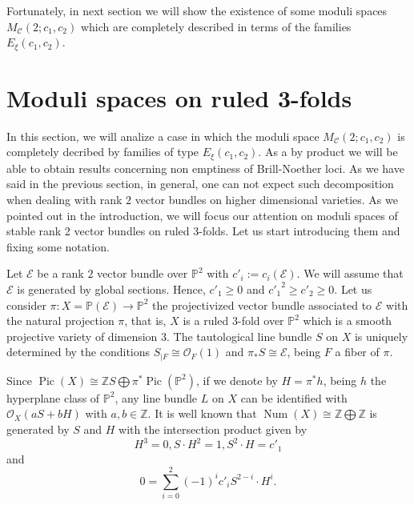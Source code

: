 \documentclass[11pt,twoside]{amsart}
\theoremstyle{definition}
\newcommand{\Pic}{\operatorname{Pic}}
\newcommand{\Num}{\operatorname{Num}}
\begin{document}
Fortunately, in next section we will show the existence of some moduli spaces $M_{\mathcal{C}}(2;c_1,c_2)$ which are completely described in terms of the families $E_{\xi}(c_1,c_2)$.




\section{Moduli spaces on ruled 3-folds}

In this section, we will analize a case in which  the moduli space $M_{\mathcal{C}}(2;c_1,c_2)$ is completely decribed by  families of type $E_{\xi}(c_1,c_2)$. As a by product we will be able to obtain results concerning non emptiness of Brill-Noether loci. As we have said in the previous section, in general, one can not expect such decomposition when dealing with rank $2$ vector bundles on higher dimensional varieties. As we pointed out in the introduction, we will focus our attention on moduli spaces of stable rank 2 vector bundles on ruled 3-folds. Let us start introducing them and fixing some notation. 

\vspace{3mm}
Let $\mathcal{E}$ be a rank $2$ vector bundle over $\mathbb{P}^2$ with $c'_i:=c_i(\mathcal{E})$. We will assume that $\mathcal{E}$ is generated by global sections. Hence, $c'_1\geq0$ and ${c'_1}^2\geq c'_2\geq0$. Let us consider $\pi:X=\mathbb{P}(\mathcal{E})\rightarrow \mathbb{P}^2$ the projectivized  vector bundle associated to $\mathcal{E}$ with the natural projection $\pi$, that is, $X$ is a ruled 3-fold over $\mathbb{P}^2$ which is a smooth projective variety of dimension $3$. The tautological line bundle $S$ on $X$  is uniquely determined by the
conditions $S_{|F}\cong \mathcal{O}_F(1)$ and  $\pi_{*}S\cong \mathcal{E}$, being $F$ a fiber of $\pi$. %

Since $\Pic(X)\cong \mathbb{Z}S\bigoplus\pi^*\Pic(\mathbb{P}^2)$,  
if we denote by $H=\pi^*h$, being $h$  the hyperplane class of $\mathbb{P}^2$, any line bundle $L$ on $X$ can be identified with $\mathcal{O}_X(aS+bH)$ with $a,b\in\mathbb{Z}$. It is well known that $\Num(X)\cong \mathbb{Z}\bigoplus \mathbb{Z}$ is generated  by $S$ and $H$
with the intersection product given by $$H^{3}=0, S\cdot H^2=1, S^2\cdot H=c'_1$$ and $$0=\sum_{i=0}^2(-1)^{i}c'_iS^{2-i}\cdot H^{i}.$$
\end{document}
